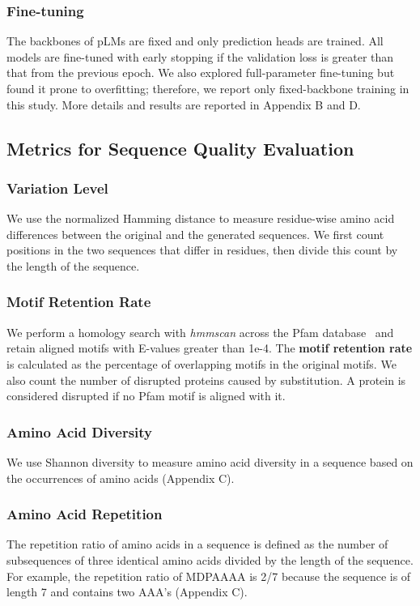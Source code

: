 \documentclass{article}
\begin{document}
\subsubsection{Fine-tuning}
The backbones of pLMs are fixed and only prediction heads are trained. All models are fine-tuned with early stopping if the validation loss is greater than that from the previous epoch. We also explored full-parameter fine-tuning but found it prone to overfitting; therefore, we report only fixed-backbone training in this study. More details and results are reported in Appendix B and D.

\subsection{Metrics for Sequence Quality Evaluation}

\subsubsection{Variation Level}
We use the normalized Hamming distance to measure residue-wise amino acid differences between the original and the generated sequences. We first count positions in the two sequences that differ in residues, then divide this count by the length of the sequence.

\subsubsection{Motif Retention Rate}
We perform a homology search with \textit{hmmscan} across the Pfam database~\cite{paysan2025pfam} and retain aligned motifs with E-values greater than 1e-4. The \textbf{motif retention rate} is calculated as the percentage of overlapping motifs in the original motifs. We also count the number of disrupted proteins caused by substitution. A protein is considered disrupted if no Pfam motif is aligned with it.

\subsubsection{Amino Acid Diversity}
We use Shannon diversity to measure amino acid diversity in a sequence based on the occurrences of amino acids (Appendix C).

\subsubsection{Amino Acid Repetition}
The repetition ratio of amino acids in a sequence is defined as the number of subsequences of three identical amino acids divided by the length of the sequence. For example, the repetition ratio of MDPAAAA is 2/7 because the sequence is of length 7 and contains two AAA's (Appendix C).
\end{document}

